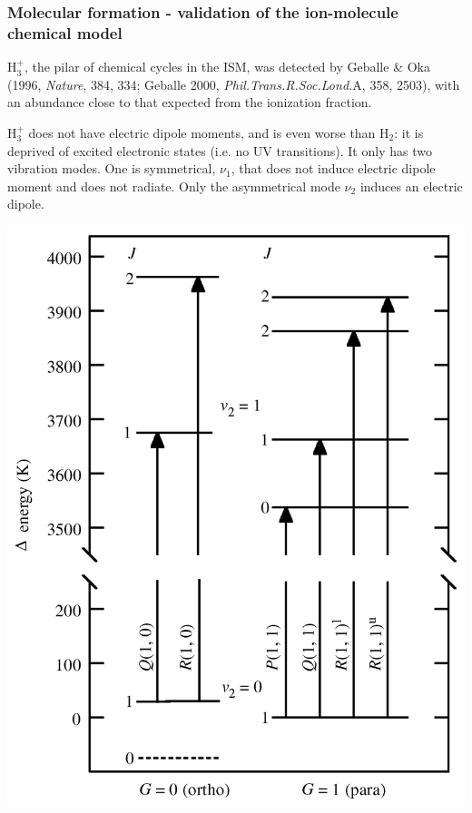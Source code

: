  \begin{frame}\frametitle{Molecular formation - validation of
the ion-molecule chemical model}

\begin{minipage}[t]{0.48\textwidth}
H$_3^+$, the pilar of chemical cycles in the ISM, was detected by
Geballe \& Oka (1996, {\em Nature}, 384, 334; Geballe 2000, {\em
Phil.Trans.R.Soc.Lond.}A, 358, 2503), with an abundance close to that
expected from the ionization fraction.

H$_3^+$ does not have electric dipole moments, and is even worse than
H$_2$: it is deprived of excited electronic states (i.e. no UV
transitions). It only has two vibration modes. One is symmetrical,
$\nu_1$, that does not induce electric dipole moment and does not
radiate. Only the asymmetrical mode $\nu_2$ induces an electric dipole.

\end{minipage}
\hfill
\begin{minipage}[t]{0.5\textwidth}
  \vspace{-0cm}
  \begin{center}
    \includegraphics[width=\textwidth,height=!]{./B/h3_levels.jpg}
  \end{center}
\end{minipage}


\end{frame} 



